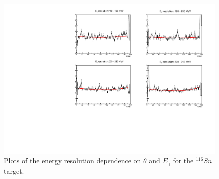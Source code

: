 \begin{figure}[H]
\begin{center}
\includegraphics[scale=0.75]{pictures/pdf/energy_resolution_sn116.pdf}
\caption{Plots of the energy resolution dependence on $\theta$ and $E_{\gamma}$ for the $^{116}Sn$ target.}
\label{energy_res1}
\end{center}
\end{figure}